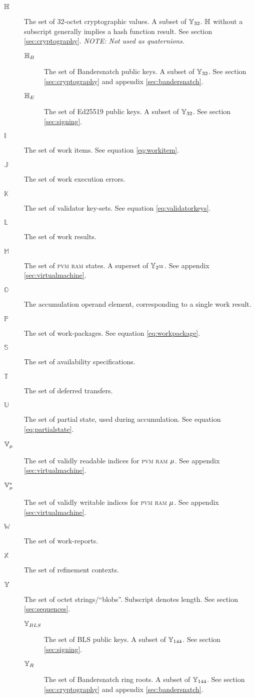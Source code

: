 \begin{description}
  \item[$\mathbb{H}$] The set of 32-octet cryptographic values. A subset of $\mathbb{Y}_{32}$. $\mathbb{H}$ without a subscript generally implies a hash function result. See section \ref{sec:cryptography}. \emph{NOTE: Not used as quaternions.}
  \begin{description}
    \item[$\mathbb{H}_B$] The set of Bandersnatch public keys. A subset of $\mathbb{Y}_{32}$. See section \ref{sec:cryptography} and appendix \ref{sec:bandersnatch}.
    \item[$\mathbb{H}_E$] The set of Ed25519 public keys. A subset of $\mathbb{Y}_{32}$. See section \ref{sec:signing}.
  \end{description}
  \item[$\mathbb{I}$] The set of work items. See equation \ref{eq:workitem}.
  \item[$\mathbb{J}$] The set of work execution errors.
  \item[$\mathbb{K}$] The set of validator key-sets. See equation \ref{eq:validatorkeys}.
  \item[$\mathbb{L}$] The set of work results.
  \item[$\mathbb{M}$] The set of \textsc{pvm} \textsc{ram} states. A superset of $\mathbb{Y}_{2^{32}}$. See appendix \ref{sec:virtualmachine}.
  \item[$\mathbb{O}$] The accumulation operand element, corresponding to a single work result.
  \item[$\mathbb{P}$] The set of work-packages. See equation \ref{eq:workpackage}.
  \item[$\mathbb{S}$] The set of availability specifications.
  \item[$\mathbb{T}$] The set of deferred transfers.
  \item[$\mathbb{U}$] The set of partial state, used during accumulation. See equation \ref{eq:partialstate}.  \item[$\mathbb{V}_{\mu}$] The set of validly readable indices for \textsc{pvm} \textsc{ram} $\mu$. See appendix \ref{sec:virtualmachine}.
  \item[$\mathbb{V}^*_{\mu}$] The set of validly writable indices for \textsc{pvm} \textsc{ram} $\mu$. See appendix \ref{sec:virtualmachine}.
  \item[$\mathbb{W}$] The set of work-reports.
  \item[$\mathbb{X}$] The set of refinement contexts.
  \item[$\mathbb{Y}$] The set of octet strings/``blobs''. Subscript denotes length. See section \ref{sec:sequences}.
  \begin{description}
    \item[$\mathbb{Y}_{BLS}$] The set of BLS public keys. A subset of $\mathbb{Y}_{144}$. See section \ref{sec:signing}.
    \item[$\mathbb{Y}_R$] The set of Bandersnatch ring roots. A subset of $\mathbb{Y}_{144}$. See section \ref{sec:cryptography} and appendix \ref{sec:bandersnatch}.
  \end{description}
\end{description}

